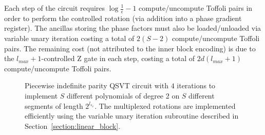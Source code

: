 Each step of the circuit requires $\log\frac{1}{\epsilon} -1$ compute/uncompute Toffoli pairs in order to perform the controlled rotation (via addition into a phase gradient register). The ancillas storing the phase factors must also be loaded/unloaded via variable unary iteration costing a total of $2(S-2)$ compute/uncompute Toffoli pairs. The remaining cost (not attributed to the inner block encoding) is due to the $l_{max}+1$-controlled Z gate in each step, costing a total of $2d(l_{max}+1)$ compute/uncompute Toffoli pairs.
\begin{figure}[htbp]
\centering

\caption{Piecewise indefinite parity QSVT circuit with $4$ iterations to implement $S$ different polynomials of degree 2 on $S$ different segments of length $2^{l_{s_x}}$. The multiplexed rotations are implemented efficiently using the variable unary iteration subroutine described in Section~\ref{section:linear_block}.}
\label{fig:qsvtcircuit}
\end{figure}

